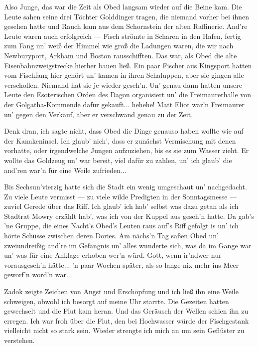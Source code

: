 Also Junge, das war die Zeit als Obed langsam wieder auf die Beine kam. Die Leute sahen seine drei Töchter Golddinger tragen, die niemand vorher bei ihnen gesehen hatte und Rauch kam aus dem Schornstein der alten Raffinerie. And're Leute waren auch erfolgreich --- Fisch strömte in Scharen in den Hafen, fertig zum Fang un' weiß der Himmel wie groß die Ladungen waren, die wir nach Newburyport, Arkham und Boston rausschifften. Das war, als Obed die alte Eisenbahnzweigstrecke hierher bauen ließ. Ein paar Fischer aus Kingsport hatten vom Fischfang hier gehört un' kamen in ihren Schaluppen, aber sie gingen alle verschollen. Niemand hat sie je wieder geseh'n. Un' genau dann hatten unsere Leute den Esoterischen Orden des Dagon organisiert un' die Freimaurerhalle von der Golgatha-Kommende dafür gekauft... hehehe! Matt Eliot war'n Freimaurer un' gegen den Verkauf, aber er verschwand genau zu der Zeit.

Denk dran, ich sagte nicht, dass Obed die Dinge genauso haben wollte wie auf der Kanakeninsel. Ich glaub' nich', dass er zunächst Vermischung mit denen vorhatte, oder irgendwelche Jungen aufzuziehen, bis es sie zum Wasser zieht. Er wollte das Goldzeug un' war bereit, viel dafür zu zahlen, un' ich glaub' die and'ren war'n für eine Weile zufrieden...

Bis Sechsun'vierzig hatte sich die Stadt ein wenig umgeschaut un' nachgedacht. Zu viele Leute vermisst --- zu viele wilde Predigten in der Sonntagsmesse --- zuviel Gerede über das Riff. Ich glaub' ich hab' selbst was dazu getan als ich Stadtrat Mowry erzählt hab', was ich von der Kuppel aus geseh'n hatte. Da gab's 'ne Gruppe, die eines Nacht's Obed's Leuten raus auf's Riff gefolgt is un' ich hörte Schüsse zwischen deren Dories. Am nächs'n Tag saßen Obed un' zweiundreißig and're im Gefängnis un' alles wunderte sich, was da im Gange war un' was für eine Anklage erhoben wer'n würd. Gott, wenn ir'ndwer nur vorausgeseh'n hätte... 'n paar Wochen später, als so lange nix mehr ins Meer geworf'n word'n war...\grqq

Zadok zeigte Zeichen von Angst und Erschöpfung und ich ließ ihn eine Weile schweigen, obwohl ich besorgt auf meine Uhr starrte. Die Gezeiten hatten gewechselt und die Flut kam heran. Und das Geräusch der Wellen schien ihn zu erregen. Ich war froh über die Flut, den bei Hochwasser würde der Fischgestank vielleicht nicht so stark sein. Wieder strengte ich mich an um sein Geflüster zu verstehen.

